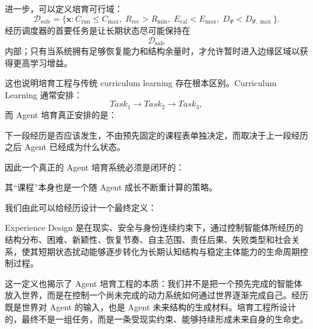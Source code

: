 进一步，可以定义培育可行域：
\[
\mathcal D_{\mathrm{safe}}
=
\{
\mathbf x:
C_{\mathrm{run}}\leq C_{\max},
\;
R_{\mathrm{rec}}>R_{\min},
\;
E_{\mathrm{cal}}<E_{\max},
\;
D_\Psi<D_{\Psi,\max}
\}.
\]
经历调度器的首要任务是让长期状态尽可能保持在
\[
\mathcal D_{\mathrm{safe}}
\]
内部；只有当系统拥有足够恢复能力和结构余量时，才允许暂时进入边缘区域以获得更高学习增益。

这也说明培育工程与传统 curriculum learning 存在根本区别。Curriculum Learning 通常安排：
\[
Task_1
\rightarrow
Task_2
\rightarrow
Task_3,
\]
而 Agent 培育真正安排的是：
\begin{statementbox}
\centering
{}
\end{statementbox}
下一段经历是否应该发生，不由预先固定的课程表单独决定，而取决于上一段经历之后 Agent 已经成为什么状态。

因此一个真正的 Agent 培育系统必须是闭环的：
\begin{statementbox}
\centering
{}
\end{statementbox}
其“课程”本身也是一个随 Agent 成长不断重计算的策略。

我们由此可以给经历设计一个最终定义：
\begin{definition*}
Experience Design 是在现实、安全与身份连续约束下，通过控制智能体所经历的结构分布、困难、新颖性、恢复节奏、自主范围、责任后果、失败类型和社会关系，使其短期状态扰动能够逐步转化为长期认知结构与稳定主体能力的生命周期控制过程。
\end{definition*}

这一定义也揭示了 Agent 培育工程的本质：我们并不是把一个预先完成的智能体放入世界，而是在控制一个尚未完成的动力系统如何通过世界逐渐完成自己。经历既是世界对 Agent 的输入，也是 Agent 未来结构的生成材料。培育工程所设计的，最终不是一组任务，而是一条受现实约束、能够持续形成未来自身的生命史。
